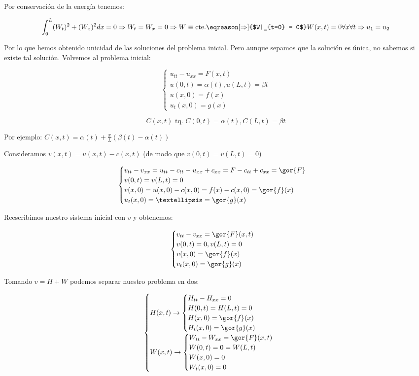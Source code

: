 		 	Por conservación de la energía tenemos:

		 	\[ \int_0^L (W_t)^2 + (W_x)^2 dx = 0 \Rightarrow W_t = W_x = 0 \Rightarrow W \equiv \text{cte.} \eqreason[\Rightarrow]{$W|_{t=0} = 0$} W(x,t) = 0 \forall x \forall t \Rightarrow u_1 = u_2 \]

		 	Por lo que hemos obtenido unicidad de las soluciones del problema inicial. Pero aunque sepamos que la solución es única, no sabemos si existe tal solución. Volvemos al problema inicial:

		 	\[ \begin{cases}
		 		u_{tt} - u_{xx} = F(x,t)\\
		 		u(0,t) = \alpha(t), u(L,t) = \beta{t} \\
		 		u(x,0) = f(x) \\
		 		u_t(x,0) = g(x)
		 	\end{cases}\]


		 	\[ C(x,t) \text{ tq. } C(0,t) = \alpha(t), C(L,t) = \beta{t}\]

		 	Por ejemplo: $C(x,t) = \alpha(t) + \frac{x}{L} (\beta(t)-\alpha(t))$

		 	Consideramos $v(x,t) = u(x,t) - c(x,t)$ (de modo que $v(0,t) = v(L,t) = 0$)

		 	\[\begin{cases}
		 		v_{tt} - v_{xx} = u_{tt} - c_{tt} - u_{xx} + c_{xx} = F - c_{tt} + c_{xx} = \gor{F} \\
		 		v(0,t) = v(L,t) = 0 \\
		 		v(x,0) = u(x,0) - c(x,0) = f(x) - c(x,0) = \gor{f}(x) \\
		 		u_t (x,0) = … = \gor{g}(x)
		 	\end{cases}
		 	\]

		 	Reescribimos nuestro sistema inicial con $v$ y obtenemos:

		 	\[ \begin{cases}
		 		v_{tt} - v_{xx} = \gor{F}(x,t)\\
		 		v(0,t) = 0, v(L,t) = 0 \\
		 		v(x,0) = \gor{f}(x) \\
		 		v_t(x,0) = \gor{g}(x)
		 	\end{cases}\]

		 	Tomando $v = H + W$ podemos separar nuestro problema en dos:

		 	\[ \begin{cases}
		 			H(x,t) \rightarrow
		 			\begin{cases}
				 		H_{tt} - H_{xx} = 0\\
				 		H(0,t) = H(L,t) = 0 \\
				 		H(x,0) = \gor{f}(x) \\
				 		H_t(x,0) = \gor{g}(x)
			 		\end{cases}\\
			 		W(x,t) \rightarrow
			 		\begin{cases}
				 		W_{tt} - W_{xx} = \gor{F}(x,t)\\
				 		W(0,t) = 0 = W(L,t) \\
				 		W(x,0) = 0 \\
				 		W_t(x,0) = 0
				 	\end{cases}
				 \end{cases}
			\]


